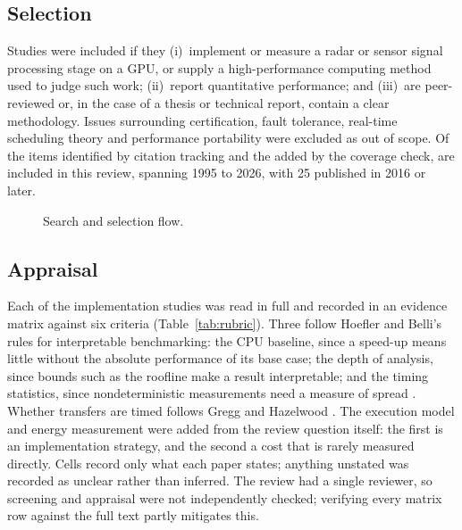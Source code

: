 \subsection{Selection}
Studies were included if they (i)~implement or measure a radar or sensor signal processing stage on a GPU, or supply a high-performance computing method used to judge such work; (ii)~report quantitative performance; and (iii)~are peer-reviewed or, in the case of a thesis or technical report, contain a clear methodology. Issues surrounding certification, fault tolerance, real-time scheduling theory and performance portability were excluded as out of scope. Of the \nStageOne{} items identified by citation tracking and the \nAdded{} added by the coverage check, \nIncluded{} are included in this review, spanning 1995 to 2026, with 25 published in 2016 or later.

\begin{figure}[!t]
  \centering
  \resizebox{0.9\linewidth}{!}{}
  \caption{Search and selection flow.}
  \label{fig:search-flow}
\end{figure}

\subsection{Appraisal}
Each of the \nAppraised{} implementation studies was read in full and recorded in an
evidence matrix against six criteria (Table~\ref{tab:rubric}).
Three follow Hoefler and Belli's rules for interpretable benchmarking: the CPU
baseline, since a speed-up means little without the absolute performance of
its base case; the depth of analysis, since bounds such as the roofline make a
result interpretable; and the timing statistics, since nondeterministic
measurements need a measure of spread
\cite{hoeflerScientificBenchmarkingParallel2015a}.
Whether transfers are timed follows Gregg and Hazelwood
\cite{greggWhereDataWhy2011a}.
The execution model and energy measurement were added from the review question
itself: the first is an implementation strategy, and the second a cost that is
rarely measured directly.
Cells record only what each paper states; anything unstated was recorded as
unclear rather than inferred.
The review had a single reviewer, so screening and appraisal were not
independently checked; verifying every matrix row against the full text
partly mitigates this.

